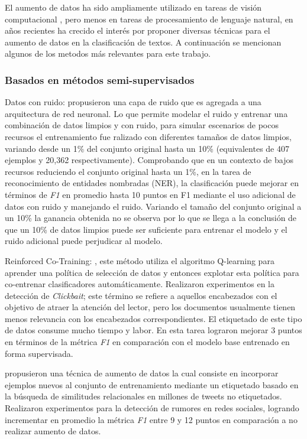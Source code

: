 El aumento de datos ha sido ampliamente utilizado en tareas de visión computacional \citep{cubuk2019autoaugment}, pero menos en tareas de procesamiento de lenguaje natural, en años recientes ha crecido el interés por proponer diversas técnicas para el aumento de datos en la clasificación de textos. A continuación se mencionan algunos de los metodos más relevantes para este trabajo.

\subsubsection{Basados en métodos semi-supervisados}

Datos con ruido: \citep{hedderich2018training} propusieron una capa de ruido que es agregada a una arquitectura de red neuronal. Lo que permite modelar el ruido y entrenar una combinación de datos limpios y con ruido, para simular escenarios de pocos recursos el entrenamiento fue ralizado con diferentes tamaños de datos limpios, variando desde un 1\% del conjunto original hasta un 10\% (equivalentes de 407 ejemplos y 20,362 respectivamente). Comprobando que en un contexto de bajos recursos reduciendo el conjunto original hasta un 1\%, en la tarea de reconocimiento de entidades nombradas (NER), la clasificación puede mejorar en términos de \textit{F1} en promedio hasta 10 puntos en F1 mediante el uso adicional de datos con ruido y manejando el ruido. Variando el tamaño del conjunto original a un 10\% la ganancia obtenida no se observa por lo que se llega a la conclusión de que un 10\% de datos limpios puede ser suficiente para entrenar el modelo y el ruido adicional puede perjudicar al modelo.

Reinforced Co-Training: \citep{wu2018reinforced}, este método utiliza el algoritmo Q-learning para aprender una política de selección de datos y entonces explotar esta política para co-entrenar clasificadores automáticamente. Realizaron experimentos en la detección de \textit{Clickbait}; este término se refiere a aquellos encabezados con el objetivo de atraer la atención del lector, pero los documentos usualmente tienen menos relevancia con los encabezados correspondientes. El etiquetado de este tipo de datos consume mucho tiempo y labor. En esta tarea lograron mejorar 3 puntos en términos de la métrica \textit{F1} en comparación con el modelo base entrenado en forma supervisada.

\citep{han2019neural} propusieron una técnica de aumento de datos la cual consiste en incorporar ejemplos nuevos al conjunto de entrenamiento mediante un etiquetado basado en la búsqueda de similitudes relacionales en millones de tweets no etiquetados. Realizaron experimentos para la detección de rumores en redes sociales, logrando incrementar en promedio la métrica \textit{F1} entre 9 y 12 puntos en comparación a no realizar aumento de datos.

